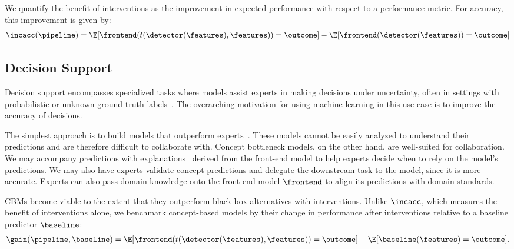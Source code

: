 \documentclass[11pt]{article}
\begin{document}
We quantify the benefit of interventions as the improvement in expected performance with respect to a performance metric. For accuracy, this improvement is given by:
\begin{align}
\incacc(\pipeline) = \E[\frontend(t(\detector(\features), \features)) = \outcome] - \E[\frontend(\detector(\features)) = \outcome] 
\end{align}

\subsection{Decision Support}
Decision support encompasses specialized tasks where models assist experts in making decisions under uncertainty, often in settings with probabilistic or unknown ground-truth labels~\citep[see, e.g., diagnostic applications][]{kawahara2018derm,irvin2019chexpert}. 
%
The overarching motivation for using machine learning in this use case is to improve the accuracy of decisions. 

The simplest approach is to build models that outperform experts~\citep{grove2000clinical, aegisdottir2006meta}. These models cannot be easily analyzed to understand their predictions and are therefore difficult to collaborate with. Concept bottleneck models, on the other hand, are well-suited for collaboration. We may accompany predictions with explanations~\citep[see][]{arrieta2020explainable, belle2021principles, adadi2018peeking} derived from the front-end model to help experts decide when to rely on the model's predictions. We may also have experts validate concept predictions and delegate the downstream task to the model, since it is more accurate. Experts can also pass domain knowledge onto the front-end model $\frontend$ to align its predictions with domain standards.

CBMs become viable to the extent that they outperform black-box alternatives with interventions. Unlike $\incacc$, which measures the benefit of interventions alone, we benchmark concept-based models by their change in performance after interventions relative to a baseline predictor $\baseline$:
\begin{align}
\gain(\pipeline, \baseline) =  \E[\frontend(t(\detector(\features), \features)) = \outcome] - \E[\baseline(\features) = \outcome] .
\label{Def::Gain}
\end{align}

  
\end{document}
